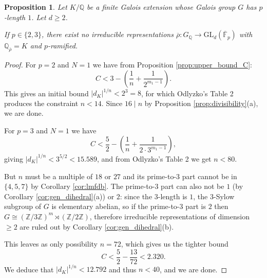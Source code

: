 \documentclass{amsart}
\newtheorem{prop}[theorem]{Proposition}
\theoremstyle{definition}
\newcommand{\lra}{\longrightarrow}
\newcommand{\Q}{\mathbb{Q}}
\newcommand{\Z}{\mathbb{Z}}
\newcommand{\F}{\mathbb{F}}
\newcommand{\bF}{\overline{\F}}
\newcommand{\br}{\overline{\rho}}
\newcommand{\GL}{\mathrm{GL}}
\renewcommand{\geq}{\geqslant}
\begin{document}
\begin{prop}\label{prop:length1}
  Let $K/\Q$ be a finite Galois extension whose Galois group $G$ has $p$-length $1$.
  Let $d\geq 2$.

  If $p\in\{2,3\}$, there exist no irreducible representations $\br:G_\Q\lra\GL_d(\bF_p)$ with $\Q_{\br}=K$ and $p$-ramified.
\end{prop}
\begin{proof}
  For $p=2$ and $N=1$ we have from Proposition \ref{prop:upper_bound_C}:
  \begin{equation*}
    C < 3 - \left(\frac{1}{n}+\frac{1}{2^{m_1-1}}\right).
  \end{equation*}
  This gives an initial bound $|d_K|^{1/n}<2^3=8$, for which Odlyzko's Table 2 produces the constraint $n<14$.
  Since $16\mid n$ by Proposition \ref{prop:divisibility}(a), we are done.

  For $p=3$ and $N=1$ we have
  \begin{equation*}
    C < \frac{5}{2} - \left(\frac{1}{n}+\frac{1}{2\cdot 3^{m_1-1}}\right),
  \end{equation*}
  giving $|d_K|^{1/n}<3^{5/2}<15.589$, and from Odlyzko's Table 2 we get $n<80$.

  But $n$ must be a multiple of $18$ or $27$ and its prime-to-$3$ part cannot be in $\{4,5,7\}$ by Corollary \ref{cor:lmfdb}.
  The prime-to-$3$ part can also not be $1$ (by Corollary \ref{cor:gen_dihedral}(a)) or $2$: since the $3$-length is $1$, the $3$-Sylow subgroup of $G$ is elementary abelian, so if the prime-to-$3$ part is $2$ then $G\cong (\Z/3\Z)^m\rtimes(\Z/2\Z)$, therefore irreducible representations of dimension $\geq 2$ are ruled out by Corollary \ref{cor:gen_dihedral}(b).

  This leaves as only possibility $n=72$, which gives us the tighter bound
  \begin{equation*}
    C<\frac{5}{2}-\frac{13}{72}<2.320.
  \end{equation*}
  We deduce that $|d_K|^{1/n}<12.792$ and thus $n<40$, and we are done.
\end{proof}
\end{document}

